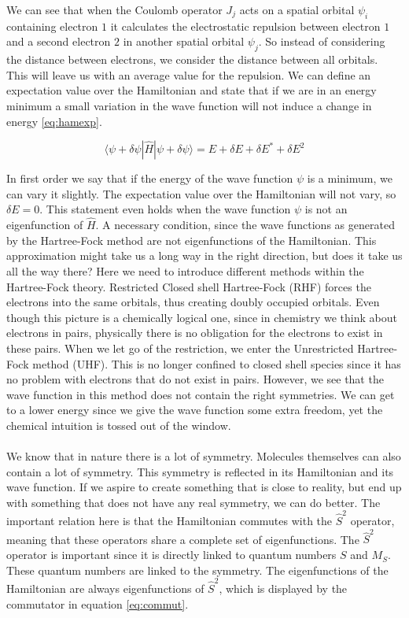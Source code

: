 \documentclass[twoside,twocolumn,9pt]{article}
\begin{document}
We can see that when the Coulomb operator $J_j$ acts on a spatial orbital $\psi_i$ containing electron $1$ it calculates the electrostatic repulsion between electron $1$ and a
second electron $2$ in another spatial orbital $\psi_j$. So instead of considering the distance between electrons, we consider the distance between all orbitals. This will leave us
with an average value for the repulsion.
We can define an expectation value over the Hamiltonian and state that if we are in an energy minimum a small variation in the wave function will not induce a change
in energy \eqref{eq:hamexp}.

\begin{equation}\label{eq:hamexp}
  \langle\psi + \delta\psi|\hat{H}|\psi + \delta\psi \rangle = E + \delta E + \delta E^* + \delta E^2
\end{equation}

In first order we say that if the energy of the wave function $\psi$ is a minimum, we can vary it slightly. The expectation value over the Hamiltonian will not vary,
so $\delta E = 0$. This statement even holds when the wave function $\psi$ is not an eigenfunction of $\hat{H}$. A necessary condition, since the wave functions as generated
by the Hartree-Fock method are not eigenfunctions of the Hamiltonian.
This approximation might take us a long way in the right direction, but does it take us all the way there? Here we need to introduce different methods within the
Hartree-Fock theory. Restricted Closed shell Hartree-Fock (RHF) forces the electrons into the same orbitals, thus creating doubly occupied orbitals. Even though this
picture is a chemically logical one, since in chemistry we think about electrons in pairs, physically there is no obligation for the electrons to exist in these pairs.
When we let go of the restriction, we enter the Unrestricted Hartree-Fock method (UHF). This  is no longer confined to closed shell species since it has no problem with
electrons that do not exist in pairs. However, we see that the wave function in this method does not contain the right symmetries. We can get to a lower energy since we give
the wave function some extra freedom, yet the chemical intuition is tossed out of the window.
\paragraph*{}
We know that in nature there is a lot of symmetry. Molecules themselves can also contain a lot of symmetry. This symmetry is reflected in its Hamiltonian and its wave function.
If we aspire to create something that is close to reality, but end up with something that does not have any real symmetry, we can do better. The important relation here is that
the Hamiltonian commutes with the $\hat{S}^2$ operator, meaning that these operators share a complete set of eigenfunctions. The $\hat{S}^2$ operator is important since it is
directly linked to quantum numbers $S$ and $M_S$\cite{Acke2019}. These quantum numbers are linked to the symmetry. The eigenfunctions of the Hamiltonian are always eigenfunctions
of $\hat{S}^2$, which is displayed by the commutator in equation \eqref{eq:commut}.
\end{document}
